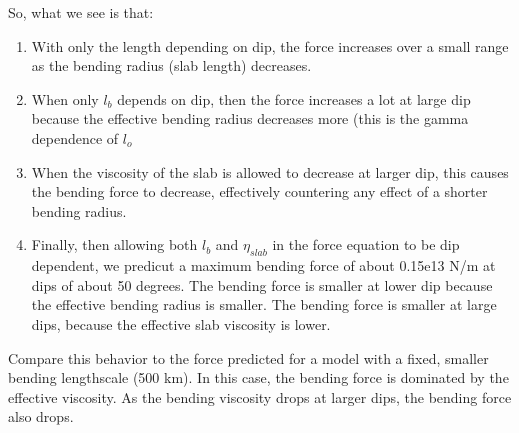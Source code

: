 \documentclass[11pt]{article}
\begin{document}
So, what we see is that: 
\begin{enumerate} 
\item With only the length depending on dip, the
force increases over a small range as the bending radius (slab length)
decreases. 
\item  When only \(l_b\) depends on dip, then the force increases
a lot at large dip because the effective bending radius decreases more
(this is the gamma dependence of \(l_o\) 
\item  When the viscosity of the
slab is allowed to decrease at larger dip, this causes the bending force
to decrease, effectively countering any effect of a shorter bending
radius. 
\item  Finally, then allowing both \(l_b\) and \(\eta_{slab}\) in
the force equation to be dip dependent, we predicut a maximum bending
force of about 0.15e13 N/m at dips of about 50 degrees. The bending
force is smaller at lower dip because the effective bending radius is
smaller. The bending force is smaller at large dips, because the
effective slab viscosity is lower.
\end{enumerate}

Compare this behavior to the force predicted for a model with a fixed,
smaller bending lengthscale (500 km). In this case, the bending force is
dominated by the effective viscosity. As the bending viscosity drops at
larger dips, the bending force also drops.





    
    
    
    
\end{document}

